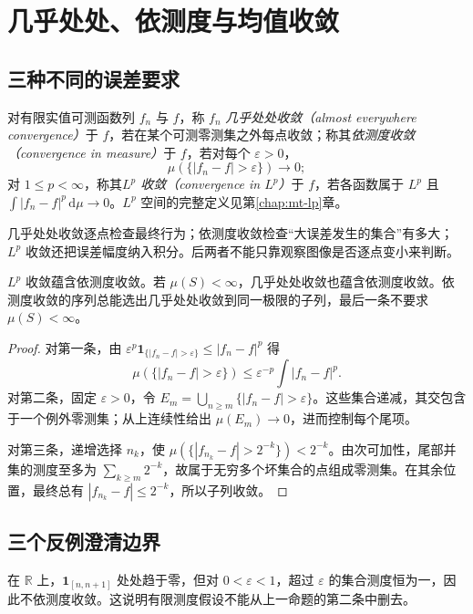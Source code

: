 \setcounter{chapter}{7} %
\chapter{几乎处处、依测度与均值收敛}
\label{chap:mt-modes}

\section{三种不同的误差要求}
\begin{definition}
对有限实值可测函数列 $f_n$ 与 $f$，称 $f_n$ \emph{几乎处处收敛（almost everywhere convergence）}于 $f$，若在某个可测零测集之外每点收敛；称其\emph{依测度收敛（convergence in measure）}于 $f$，若对每个 $\varepsilon>0$，
\[
 \mu(\{|f_n-f|>\varepsilon\})\longrightarrow0;
\]
对 $1\leq p<\infty$，称其\emph{$L^p$ 收敛（convergence in $L^p$）}于 $f$，若各函数属于 $L^p$ 且 $\int|f_n-f|^p\,\mathrm d\mu\to0$。$L^p$ 空间的完整定义见第\ref{chap:mt-lp}章。
\end{definition}
几乎处处收敛逐点检查最终行为；依测度收敛检查“大误差发生的集合”有多大；$L^p$ 收敛还把误差幅度纳入积分。后两者不能只靠观察图像是否逐点变小来判断。

\begin{proposition}[收敛方式之间的联系]
$L^p$ 收敛蕴含依测度收敛。若 $\mu(S)<\infty$，几乎处处收敛也蕴含依测度收敛。依测度收敛的序列总能选出几乎处处收敛到同一极限的子列，最后一条不要求 $\mu(S)<\infty$。
\label{prop:mt-convergence-implications}
\end{proposition}
\begin{proof}
对第一条，由 $\varepsilon^p\mathbf1_{\{|f_n-f|>\varepsilon\}}\leq|f_n-f|^p$ 得
\[
 \mu(\{|f_n-f|>\varepsilon\})
 \leq\varepsilon^{-p}\int|f_n-f|^p.
\]
对第二条，固定 $\varepsilon>0$，令 $E_m=\bigcup_{n\geq m}\{|f_n-f|>\varepsilon\}$。这些集合递减，其交包含于一个例外零测集；从上连续性给出 $\mu(E_m)\to0$，进而控制每个尾项。

对第三条，递增选择 $n_k$，使 $\mu(\{|f_{n_k}-f|>2^{-k}\})<2^{-k}$。由次可加性，尾部并集的测度至多为 $\sum_{k\geq m}2^{-k}$，故属于无穷多个坏集合的点组成零测集。在其余位置，最终总有 $|f_{n_k}-f|\leq2^{-k}$，所以子列收敛。
\end{proof}

\section{三个反例澄清边界}
在 $\mathbb R$ 上，$\mathbf1_{[n,n+1]}$ 处处趋于零，但对 $0<\varepsilon<1$，超过 $\varepsilon$ 的集合测度恒为一，因此不依测度收敛。这说明有限测度假设不能从上一命题的第二条中删去。

